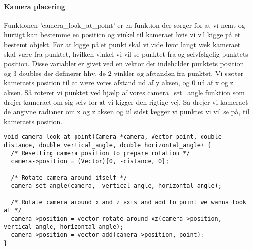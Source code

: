 \paragraph{Kamera placering}

Funktionen 'camera\_look\_at\_point' er en funktion der sørger for at vi nemt og hurtigt kan bestemme en position og vinkel til kameraet hvis vi vil kigge på et bestemt objekt. 
For at kigge på et punkt skal vi vide hvor langt væk kameraet skal være fra punktet, hvilken vinkel vi vil se punktet fra og selvfølgelig punktets position. Disse variabler er givet ved en vektor der indeholder punktets position og 3 doubles der definerer hhv. de 2 vinkler og afstanden fra punktet.
Vi sætter kameraets position til at være vores afstand ud af y aksen, og 0 ud af x og z aksen. Så roterer vi punktet ved hjælp af vores camera\_set\_angle funktion som drejer kameraet om sig selv for at vi kigger den rigtige vej.
Så drejer vi kameraet de angivne radianer om x og z aksen og til sidst lægger vi punktet vi vil se på, til kameraets position.

\begin{lstlisting}[style=Cstyle, caption=Kode-uddrag fra camera.c: camera\_look\_at\_point]
void camera_look_at_point(Camera *camera, Vector point, double distance, double vertical_angle, double horizontal_angle) {
  /* Resetting camera position to prepare rotation */
  camera->position = (Vector){0, -distance, 0};

  /* Rotate camera around itself */
  camera_set_angle(camera, -vertical_angle, horizontal_angle);
  
  /* Rotate camera around x and z axis and add to point we wanna look at */
  camera->position = vector_rotate_around_xz(camera->position, -vertical_angle, horizontal_angle);
  camera->position = vector_add(camera->position, point);
}
\end{lstlisting}